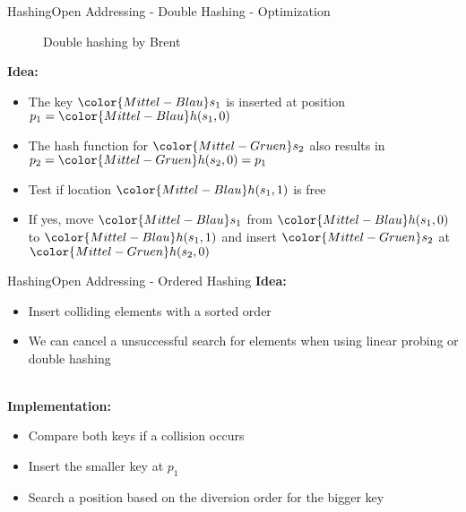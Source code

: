 \begin{frame}{Hashing}{Open Addressing - Double Hashing - Optimization}
  \vspace{-2.0em}
  \begin{figure}[!h]
    \begin{adjustbox}{width=0.9\linewidth}%
    \end{adjustbox}
    \vspace{-1.0em}
    \caption{Double hashing by Brent}%
    \label{fig:hashing:open_addressing:double_hashing_brent}%
  \end{figure}
  \vspace{-1.0em}
  \textbf{Idea:}
  \begin{itemize}
    \item
      The key ${\color{Mittel-Blau}s_1}$ is inserted at position
      \begin{math}
        p_1 = {\color{Mittel-Blau}h(s_1, 0)}
      \end{math}
    \item
      The hash function for ${\color{Mittel-Gruen}s_2}$ also results in
      \begin{math}
        p_2 = {\color{Mittel-Gruen}h(s_2, 0)} = p_1
      \end{math}
    \item
      Test if location ${\color{Mittel-Blau}h(s_1, 1)}$ is free
    \item
      If yes, move ${\color{Mittel-Blau}s_1}$ from
      ${\color{Mittel-Blau}h(s_1, 0)}$ to ${\color{Mittel-Blau}h(s_1, 1)}$
      and insert ${\color{Mittel-Gruen}s_2}$ at
      ${\color{Mittel-Gruen}h(s_2, 0)}$
  \end{itemize}
\end{frame}


\begin{frame}{Hashing}{Open Addressing - Ordered Hashing}
  \textbf{Idea:}
  \begin{itemize}
    \item
      Insert colliding elements with a sorted order
    \item
      We can cancel a unsuccessful search for elements when using
      linear probing or double hashing
  \end{itemize}
  \hfill\\[0.5em]
  \textbf{Implementation:}
  \begin{itemize}
    \item
      Compare both keys if a collision occurs
    \item
      Insert the smaller key at $p_1$
    \item
      Search a position based on the diversion order for the bigger key
  \end{itemize}
\end{frame}

